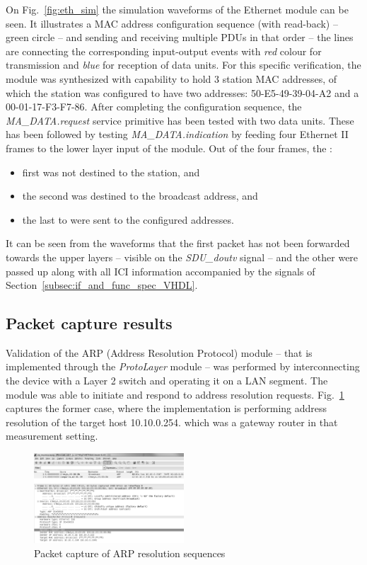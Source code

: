 \documentclass[journal]{IEEEtran}
\begin{document}
On Fig.~\ref{fig:eth_sim} the simulation waveforms of the Ethernet module can be seen. It illustrates a MAC address
configuration sequence (with read-back) -- green circle -- and sending and receiving multiple PDUs in that order -- the
lines are connecting the corresponding input-output events with \emph{red} colour for transmission and \emph{blue} for
reception of data units. For this specific verification, the module was synthesized with capability to hold 3 station
MAC addresses, of which the station was configured to have two addresses: 50-E5-49-39-04-A2 and a 00-01-17-F3-F7-86.
After completing the configuration sequence, the \emph{MA\_DATA.request} service primitive has been tested with two
data units. These has been followed by testing \emph{MA\_DATA.indication} by feeding four Ethernet II frames to the
lower layer input of the module. Out of the four frames, the :
\begin{itemize}
    \item first was not destined to the station, and
    \item the second was destined to the broadcast address, and
    \item the last to were sent to the configured addresses.
\end{itemize}
It can be seen from the waveforms that the first packet has not been forwarded towards the upper layers -- visible on
the \emph{SDU\_doutv} signal -- and the other were passed up along with all ICI information accompanied by the signals
of Section~\ref{subsec:if_and_func_spec_VHDL}.

\subsection{Packet capture results}

Validation of the ARP (Address Resolution Protocol) module -- that is implemented through the \emph{ProtoLayer} module
-- was performed by interconnecting the device with a Layer 2 switch and operating it on a LAN segment. The module was
able to initiate and respond to address resolution requests. Fig.~\ref{fig:pcap_arp_seq} captures the former case,
where the implementation is performing address resolution of the target host 10.10.0.254. which was a gateway router in
that measurement setting.

\begin{figure}[!htb]
    \centering
    \includegraphics[width=0.5\textwidth]{figures_raw/arp_transaction.png}
    \caption{Packet capture of ARP resolution sequences}
    \label{fig:pcap_arp_seq}
\end{figure}
\end{document}
